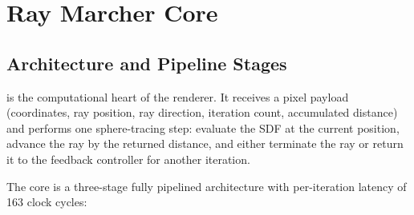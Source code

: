 \section{Ray Marcher Core}
\label{sec:marchcore}

\subsection{Architecture and Pipeline Stages}

 is the computational heart of the renderer. It receives
a pixel payload (coordinates, ray position, ray direction, iteration count,
accumulated distance) and performs one sphere-tracing step: evaluate the SDF
at the current position, advance the ray by the returned distance, and either
terminate the ray or return it to the feedback controller for another iteration.

The core is a three-stage fully pipelined architecture with per-iteration latency
of 163 clock cycles:

